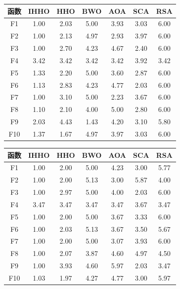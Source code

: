 \documentclass{wzuthesis}
\begin{document}
\begin{table}[htbp]
  \centering
  \small
    \begin{tabular}{ccccccc}
    \toprule
    函数    & IHHO  & HHO   & BWO   & AOA   & SCA   & RSA \\
    \midrule
    F1  & 1.00  & 2.03  & 5.00  & 3.93  & 3.03  & 6.00 \\
    F2  & 1.00  & 2.13  & 4.97  & 2.93  & 3.97  & 6.00 \\
    F3  & 1.00  & 2.70  & 4.23  & 4.67  & 2.40  & 6.00 \\
    F4  & 3.42  & 3.42  & 3.42  & 3.42  & 3.92  & 3.42 \\
    F5  & 1.33  & 2.20  & 5.00  & 3.60  & 2.87  & 6.00 \\
    F6  & 1.13  & 2.83  & 4.23  & 4.77  & 2.03  & 6.00 \\
    F7  & 1.00  & 3.10  & 5.00  & 2.23  & 3.67  & 6.00 \\
    F8  & 1.10  & 2.10  & 4.00  & 5.00  & 2.80  & 6.00 \\
    F9  & 2.03  & 4.43  & 1.43  & 4.20  & 3.10  & 5.80 \\
    F10 & 1.37  & 1.67  & 4.97  & 3.97  & 3.03  & 6.00 \\
    \bottomrule
    \end{tabular}%
  \label{tb:IHHO-Friedman-dim10}%
\end{table}%

\begin{table}[htbp]
  \centering
  \small
    \begin{tabular}{ccccccc}
    \toprule
    函数    & IHHO  & HHO   & BWO   & AOA   & SCA   & RSA \\
    \midrule
    F1  & 1.00  & 2.00  & 5.00  & 4.23  & 3.00  & 5.77 \\
    F2  & 1.00  & 2.00  & 5.13  & 3.00  & 5.87  & 4.00 \\
    F3  & 1.00  & 2.97  & 5.00  & 4.00  & 2.03  & 6.00 \\
    F4  & 3.47  & 3.47  & 3.47  & 3.47  & 3.67  & 3.47 \\
    F5  & 1.00  & 2.00  & 5.00  & 3.67  & 3.33  & 6.00 \\
    F6  & 1.00  & 2.03  & 5.13  & 3.67  & 3.50  & 5.67 \\
    F7  & 1.00  & 2.00  & 5.00  & 3.07  & 3.93  & 6.00 \\
    F8  & 1.00  & 2.07  & 3.87  & 4.60  & 4.97  & 4.50 \\
    F9  & 1.00  & 3.93  & 4.60  & 5.97  & 2.03  & 3.47 \\
    F10 & 1.03  & 1.97  & 4.27  & 4.77  & 3.00  & 5.97 \\
    \bottomrule
    \end{tabular}%
  \label{tb:IHHO-Friedman-dim30}%
\end{table}%
\end{document}
